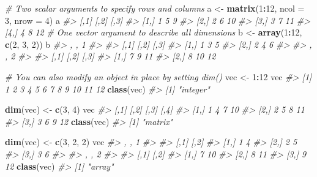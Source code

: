\documentclass[]{book}
\newenvironment{Shaded}{\begin{snugshade}}{\end{snugshade}}
\newcommand{\KeywordTok}[1]{\textcolor[rgb]{0.13,0.29,0.53}{\textbf{#1}}}
\newcommand{\DataTypeTok}[1]{\textcolor[rgb]{0.13,0.29,0.53}{#1}}
\newcommand{\DecValTok}[1]{\textcolor[rgb]{0.00,0.00,0.81}{#1}}
\newcommand{\StringTok}[1]{\textcolor[rgb]{0.31,0.60,0.02}{#1}}
\newcommand{\CommentTok}[1]{\textcolor[rgb]{0.56,0.35,0.01}{\textit{#1}}}
\newcommand{\OperatorTok}[1]{\textcolor[rgb]{0.81,0.36,0.00}{\textbf{#1}}}
\newcommand{\NormalTok}[1]{#1}
\theoremstyle{definition}
\theoremstyle{definition}
\theoremstyle{definition}
\theoremstyle{remark}
\begin{document}
\begin{Shaded}
\begin{Highlighting}[]
\CommentTok{# Two scalar arguments to specify rows and columns}
\NormalTok{a <-}\StringTok{ }\KeywordTok{matrix}\NormalTok{(}\DecValTok{1}\OperatorTok{:}\DecValTok{12}\NormalTok{, }\DataTypeTok{ncol =} \DecValTok{3}\NormalTok{, }\DataTypeTok{nrow =} \DecValTok{4}\NormalTok{)}
\NormalTok{a}
\CommentTok{#>      [,1] [,2] [,3]}
\CommentTok{#> [1,]    1    5    9}
\CommentTok{#> [2,]    2    6   10}
\CommentTok{#> [3,]    3    7   11}
\CommentTok{#> [4,]    4    8   12}
\CommentTok{# One vector argument to describe all dimensions}
\NormalTok{b <-}\StringTok{ }\KeywordTok{array}\NormalTok{(}\DecValTok{1}\OperatorTok{:}\DecValTok{12}\NormalTok{, }\KeywordTok{c}\NormalTok{(}\DecValTok{2}\NormalTok{, }\DecValTok{3}\NormalTok{, }\DecValTok{2}\NormalTok{))}
\NormalTok{b}
\CommentTok{#> , , 1}
\CommentTok{#> }
\CommentTok{#>      [,1] [,2] [,3]}
\CommentTok{#> [1,]    1    3    5}
\CommentTok{#> [2,]    2    4    6}
\CommentTok{#> }
\CommentTok{#> , , 2}
\CommentTok{#> }
\CommentTok{#>      [,1] [,2] [,3]}
\CommentTok{#> [1,]    7    9   11}
\CommentTok{#> [2,]    8   10   12}

\CommentTok{# You can also modify an object in place by setting dim()}
\NormalTok{vec <-}\StringTok{ }\DecValTok{1}\OperatorTok{:}\DecValTok{12}
\NormalTok{vec}
\CommentTok{#>  [1]  1  2  3  4  5  6  7  8  9 10 11 12}
\KeywordTok{class}\NormalTok{(vec)}
\CommentTok{#> [1] "integer"}

\KeywordTok{dim}\NormalTok{(vec) <-}\StringTok{ }\KeywordTok{c}\NormalTok{(}\DecValTok{3}\NormalTok{, }\DecValTok{4}\NormalTok{)}
\NormalTok{vec}
\CommentTok{#>      [,1] [,2] [,3] [,4]}
\CommentTok{#> [1,]    1    4    7   10}
\CommentTok{#> [2,]    2    5    8   11}
\CommentTok{#> [3,]    3    6    9   12}
\KeywordTok{class}\NormalTok{(vec)}
\CommentTok{#> [1] "matrix"}

\KeywordTok{dim}\NormalTok{(vec) <-}\StringTok{ }\KeywordTok{c}\NormalTok{(}\DecValTok{3}\NormalTok{, }\DecValTok{2}\NormalTok{, }\DecValTok{2}\NormalTok{)}
\NormalTok{vec}
\CommentTok{#> , , 1}
\CommentTok{#> }
\CommentTok{#>      [,1] [,2]}
\CommentTok{#> [1,]    1    4}
\CommentTok{#> [2,]    2    5}
\CommentTok{#> [3,]    3    6}
\CommentTok{#> }
\CommentTok{#> , , 2}
\CommentTok{#> }
\CommentTok{#>      [,1] [,2]}
\CommentTok{#> [1,]    7   10}
\CommentTok{#> [2,]    8   11}
\CommentTok{#> [3,]    9   12}
\KeywordTok{class}\NormalTok{(vec)}
\CommentTok{#> [1] "array"}
\end{Highlighting}
\end{Shaded}
\end{document}
